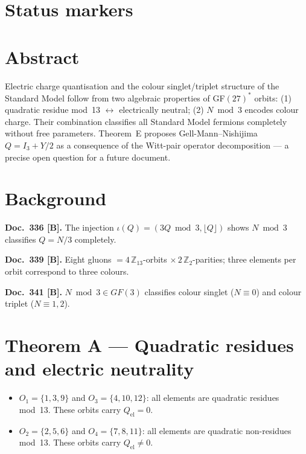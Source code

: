 
\providecommand{\BM}{\textbf{[B]}}
\providecommand{\KM}{\textbf{[K]}}
\providecommand{\SM}{\textbf{[S]}}
\providecommand{\LM}{\textbf{[L]}}
\providecommand{\SetzM}{\textbf{[SETZUNG]}}

{}

\section*{Status markers}


\section*{Abstract}

Electric charge quantisation and the colour singlet/triplet structure of the
Standard Model follow from two algebraic properties of GF$(27)^*$ orbits:
(1) quadratic residue mod~13 $\leftrightarrow$ electrically neutral;
(2) $N\bmod3$ encodes colour charge. Their combination classifies all Standard
Model fermions completely without free parameters. Theorem~E proposes Gell-Mann--Nishijima
$Q=I_3+Y/2$ as a consequence of the Witt-pair operator decomposition --- a precise
open question for a future document.

\section{Background}

\textbf{Doc.~336 \BM.} The injection $\iota(Q)=(3Q\bmod3,\lfloor Q\rfloor)$
shows $N\bmod3$ classifies $Q=N/3$ completely.

\textbf{Doc.~339 \BM.} Eight gluons $= 4\,\mathbb{Z}_{13}$-orbits $\times\,2\,\mathbb{Z}_2$-parities;
three elements per orbit correspond to three colours.

\textbf{Doc.~341 \BM.} $N\bmod3\in GF(3)$ classifies colour singlet ($N\equiv0$)
and colour triplet ($N\equiv1,2$).

\section{Theorem A --- Quadratic residues and electric neutrality}

\begin{theorem}[Electric neutrality $\leftrightarrow$ QR mod 13 \BM]
\begin{itemize}
\item $O_1=\{1,3,9\}$ and $O_3=\{4,10,12\}$: all elements are quadratic residues
  mod~13. These orbits carry $Q_\mathrm{el}=0$.
\item $O_2=\{2,5,6\}$ and $O_4=\{7,8,11\}$: all elements are quadratic
  non-residues mod~13. These orbits carry $Q_\mathrm{el}\neq0$.
\end{itemize}
\end{theorem}

